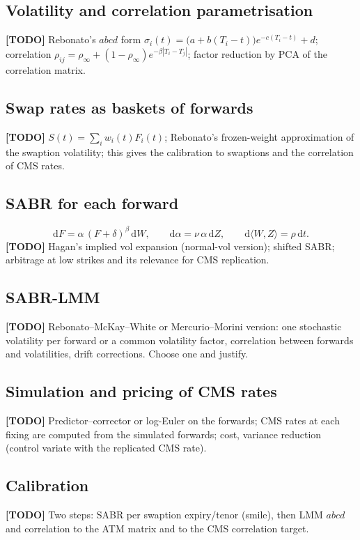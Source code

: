 \documentclass[11pt,a4paper]{article}
\theoremstyle{plain}
\theoremstyle{definition}
\newcommand{\dd}{\mathrm{d}}
\newcommand{\todo}[1]{\textcolor{red!70!black}{\textbf{[TODO]} #1}}
\begin{document}
\subsection{Volatility and correlation parametrisation}
\todo{Rebonato's $abcd$ form $\sigma_i(t)=\bigl(a+b(T_i-t)\bigr)e^{-c(T_i-t)}+d$; correlation $\rho_{ij}=\rho_\infty+(1-\rho_\infty)e^{-\beta|T_i-T_j|}$; factor reduction by PCA of the correlation matrix.}

\subsection{Swap rates as baskets of forwards}
\todo{$S(t)=\sum_i w_i(t)F_i(t)$; Rebonato's frozen-weight approximation of the swaption volatility; this gives the calibration to swaptions and the correlation of CMS rates.}

\subsection{SABR for each forward}
\begin{equation}
    \dd F = \alpha\,(F+\delta)^{\beta}\,\dd W,\qquad \dd\alpha = \nu\,\alpha\,\dd Z,\qquad \dd\langle W,Z\rangle=\rho\,\dd t.
\end{equation}
\todo{Hagan's implied vol expansion (normal-vol version); shifted SABR; arbitrage at low strikes and its relevance for CMS replication.}

\subsection{SABR-LMM}
\todo{Rebonato--McKay--White or Mercurio--Morini version: one stochastic volatility per forward or a common volatility factor, correlation between forwards and volatilities, drift corrections. Choose one and justify.}

\subsection{Simulation and pricing of CMS rates}
\todo{Predictor--corrector or log-Euler on the forwards; CMS rates at each fixing are computed from the simulated forwards; cost, variance reduction (control variate with the replicated CMS rate).}

\subsection{Calibration}
\todo{Two steps: SABR per swaption expiry/tenor (smile), then LMM $abcd$ and correlation to the ATM matrix and to the CMS correlation target.}
\end{document}
